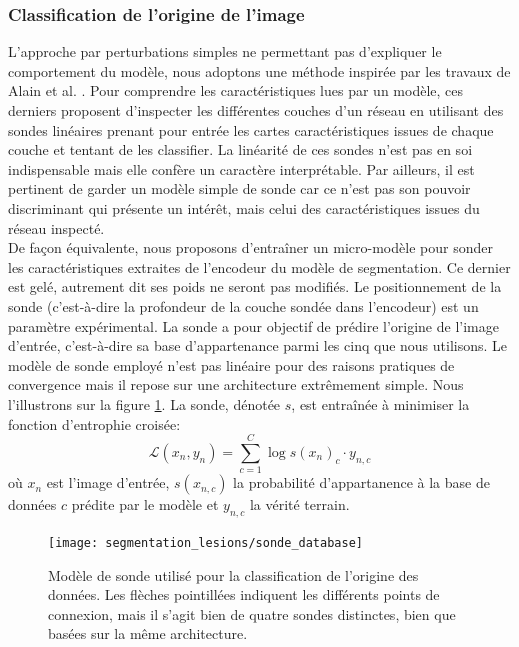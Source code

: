 \subsubsection{Classification de l'origine de l'image}
L'approche par perturbations simples ne permettant pas d'expliquer le comportement du modèle, nous adoptons une méthode inspirée par les travaux de Alain et al. \cite{DBLP:conf/iclr/AlainB17}. Pour comprendre les caractéristiques lues par un modèle, ces derniers proposent d'inspecter les différentes couches d'un réseau en utilisant des sondes linéaires prenant pour entrée les cartes caractéristiques issues de chaque couche et tentant de les classifier. La linéarité de ces sondes n'est pas en soi indispensable mais elle confère un caractère interprétable. Par ailleurs, il est pertinent de garder un modèle simple de sonde car ce n'est pas son pouvoir discriminant qui présente un intérêt, mais celui des caractéristiques issues du réseau inspecté. \\
De façon équivalente, nous proposons d'entraîner un micro-modèle pour sonder les caractéristiques extraites de l'encodeur du modèle de segmentation. Ce dernier est gelé, autrement dit ses poids ne seront pas modifiés. Le positionnement de la sonde (c'est-à-dire la profondeur de la couche sondée dans l'encodeur) est un paramètre expérimental. La sonde a pour objectif de prédire l'origine de l'image d'entrée, c'est-à-dire sa base d'appartenance parmi les cinq que nous utilisons. Le modèle de sonde employé n'est pas linéaire pour des raisons pratiques de convergence mais il repose sur une architecture extrêmement simple. Nous l'illustrons sur la figure \ref{fig:ModeleSondeClassifDatabase}.
La sonde, dénotée $s$, est entraînée à minimiser la fonction d'entrophie croisée:
\begin{equation}
	\mathcal{L}(x_n, y_n) = \sum_{c=1}^{C} \log s(x_{n})_c \cdot y_{n, c}
\end{equation}
où $x_n$ est l'image d'entrée, $s(x_{n, c})$ la probabilité d'appartanence à la base de données $c$ prédite par le modèle et $y_{n, c}$ la vérité terrain.
\begin{figure}[h!]
	\centering
	\texttt{[image: segmentation\_lesions/sonde\_database]}
	\caption{Modèle de sonde utilisé pour la classification de l'origine des données. Les flèches pointillées indiquent les différents points de connexion, mais il s'agit bien de quatre sondes distinctes, bien que basées sur la même architecture.}
	\label{fig:ModeleSondeClassifDatabase}
\end{figure}
 
